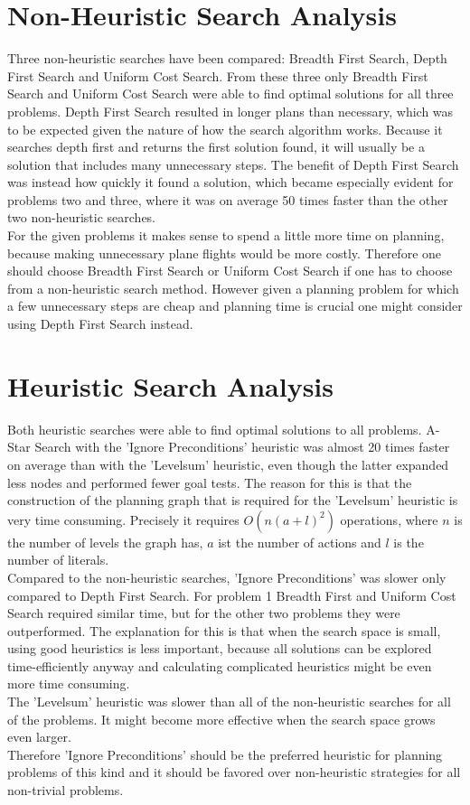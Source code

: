 \documentclass{article}
\begin{document}
\section*{Non-Heuristic Search Analysis}
Three non-heuristic searches have been compared: Breadth First Search, Depth First
Search and Uniform Cost Search. From these three only Breadth First Search and Uniform
Cost Search were able to find optimal solutions for all three problems. Depth
First Search resulted in longer plans than necessary, which was to be expected given
the nature of how the search algorithm works. Because it searches depth first and returns
the first solution found, it will usually be a solution that includes many unnecessary
steps. The benefit of Depth First Search
was instead how quickly it found a solution, which became especially evident for problems
two and three, where it was on average 50 times faster than the other two non-heuristic
searches. \\
For the given problems it makes sense to spend a little more time on planning,
because making unnecessary plane flights would be more costly. Therefore one should choose
Breadth First Search or Uniform Cost Search if one has to choose from a non-heuristic
search method. However given a planning problem for which a few unnecessary steps are
cheap and planning time is crucial one might consider using Depth First Search instead.

\section*{Heuristic Search Analysis}
Both heuristic searches were able to find optimal solutions to all problems. A-Star
Search with the 'Ignore Preconditions' heuristic was almost 20 times faster on average
than with the 'Levelsum' heuristic, even though the latter expanded less nodes and
performed fewer goal tests. The reason for this is that the construction of the planning
graph that is required for the 'Levelsum' heuristic is very time consuming. Precisely
it requires $O(n(a+l)^2)$ operations, where $n$ is the number of levels the graph has,
$a$ ist the number of actions and $l$ is the number of literals. \cite{AIMA}\\
Compared to the non-heuristic searches, 'Ignore Preconditions' was slower only compared
to Depth First Search. For problem 1 Breadth First and Uniform Cost Search required
similar time, but for the other two problems they were outperformed. The explanation
for this is that when the search space is small, using good heuristics is less important, because
all solutions can be explored time-efficiently anyway and calculating complicated heuristics
might be even more time consuming. \\
The 'Levelsum' heuristic was slower than all of the non-heuristic searches for all
of the problems. It might become more effective when the search space grows even larger. \\
Therefore 'Ignore Preconditions' should be the preferred heuristic for planning
problems of this kind and it should be favored over non-heuristic strategies for
all non-trivial problems.
\end{document}

